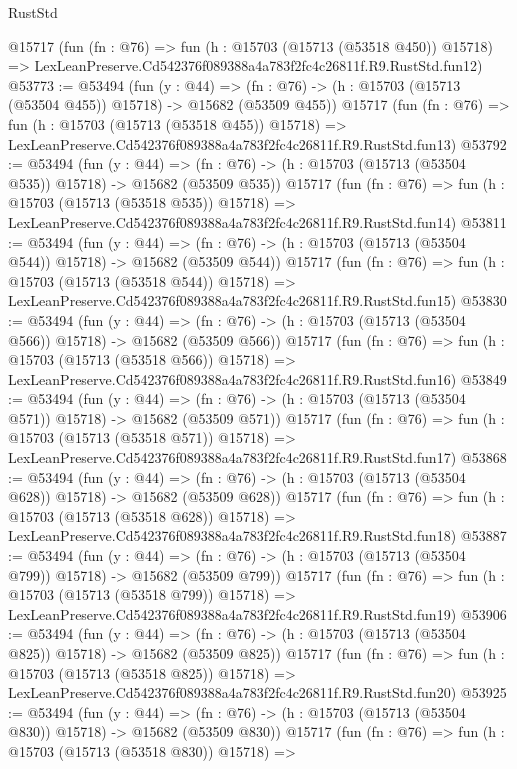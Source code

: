 \begin{lexlean}{RustStd}
\begin{coremodule}
    @15717
    (fun (fn : @76) =>
    fun (h : @15703 (@15713 (@53518 @450)) @15718) =>
    LexLeanPreserve.Cd542376f089388a4a783f2fc4c26811f.R9.RustStd.fun12)
@53773 := @53494
    (fun (y : @44) =>
    (fn : @76) -> (h : @15703 (@15713 (@53504 @455)) @15718) -> @15682 (@53509 @455))
    @15717
    (fun (fn : @76) =>
    fun (h : @15703 (@15713 (@53518 @455)) @15718) =>
    LexLeanPreserve.Cd542376f089388a4a783f2fc4c26811f.R9.RustStd.fun13)
@53792 := @53494
    (fun (y : @44) =>
    (fn : @76) -> (h : @15703 (@15713 (@53504 @535)) @15718) -> @15682 (@53509 @535))
    @15717
    (fun (fn : @76) =>
    fun (h : @15703 (@15713 (@53518 @535)) @15718) =>
    LexLeanPreserve.Cd542376f089388a4a783f2fc4c26811f.R9.RustStd.fun14)
@53811 := @53494
    (fun (y : @44) =>
    (fn : @76) -> (h : @15703 (@15713 (@53504 @544)) @15718) -> @15682 (@53509 @544))
    @15717
    (fun (fn : @76) =>
    fun (h : @15703 (@15713 (@53518 @544)) @15718) =>
    LexLeanPreserve.Cd542376f089388a4a783f2fc4c26811f.R9.RustStd.fun15)
@53830 := @53494
    (fun (y : @44) =>
    (fn : @76) -> (h : @15703 (@15713 (@53504 @566)) @15718) -> @15682 (@53509 @566))
    @15717
    (fun (fn : @76) =>
    fun (h : @15703 (@15713 (@53518 @566)) @15718) =>
    LexLeanPreserve.Cd542376f089388a4a783f2fc4c26811f.R9.RustStd.fun16)
@53849 := @53494
    (fun (y : @44) =>
    (fn : @76) -> (h : @15703 (@15713 (@53504 @571)) @15718) -> @15682 (@53509 @571))
    @15717
    (fun (fn : @76) =>
    fun (h : @15703 (@15713 (@53518 @571)) @15718) =>
    LexLeanPreserve.Cd542376f089388a4a783f2fc4c26811f.R9.RustStd.fun17)
@53868 := @53494
    (fun (y : @44) =>
    (fn : @76) -> (h : @15703 (@15713 (@53504 @628)) @15718) -> @15682 (@53509 @628))
    @15717
    (fun (fn : @76) =>
    fun (h : @15703 (@15713 (@53518 @628)) @15718) =>
    LexLeanPreserve.Cd542376f089388a4a783f2fc4c26811f.R9.RustStd.fun18)
@53887 := @53494
    (fun (y : @44) =>
    (fn : @76) -> (h : @15703 (@15713 (@53504 @799)) @15718) -> @15682 (@53509 @799))
    @15717
    (fun (fn : @76) =>
    fun (h : @15703 (@15713 (@53518 @799)) @15718) =>
    LexLeanPreserve.Cd542376f089388a4a783f2fc4c26811f.R9.RustStd.fun19)
@53906 := @53494
    (fun (y : @44) =>
    (fn : @76) -> (h : @15703 (@15713 (@53504 @825)) @15718) -> @15682 (@53509 @825))
    @15717
    (fun (fn : @76) =>
    fun (h : @15703 (@15713 (@53518 @825)) @15718) =>
    LexLeanPreserve.Cd542376f089388a4a783f2fc4c26811f.R9.RustStd.fun20)
@53925 := @53494
    (fun (y : @44) =>
    (fn : @76) -> (h : @15703 (@15713 (@53504 @830)) @15718) -> @15682 (@53509 @830))
    @15717
    (fun (fn : @76) =>
    fun (h : @15703 (@15713 (@53518 @830)) @15718) =>

\end{coremodule}
\end{lexlean}
